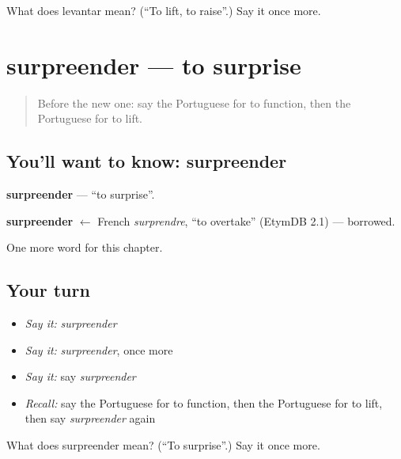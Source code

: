 \begin{tcolorbox}[breakable,colback=teal!4,colframe=teal!35!black,title={Before you move on}]
What does levantar mean? (\textquotedblleft{}To lift, to raise\textquotedblright{}.) Say it once more.
\end{tcolorbox}
\section[surpreender]{surpreender — to surprise}

\label{lesson:PT-C238-surpreender}



\begin{quote}
Before the new one: say the Portuguese for to function, then the Portuguese for to lift.
\end{quote}

\subsection*{You'll want to know: surpreender}
\textbf{surpreender} — \textquotedblleft{}to surprise\textquotedblright{}.

\begin{cousinweb}
\textbf{surpreender} $\leftarrow$ French \emph{surprendre}, \textquotedblleft{}to overtake\textquotedblright{} (EtymDB 2.1) — borrowed.
\end{cousinweb}

\begin{grammarlens}[title={What you've built}]
One more word for this chapter.
\end{grammarlens}

\subsection*{Your turn}
\begin{itemize}
\raggedright
  \item \emph{Say it:} \emph{surpreender}
  \item \emph{Say it:} \emph{surpreender}, once more
  \item \emph{Say it:} say \emph{surpreender}
  \item \emph{Recall:} say the Portuguese for to function, then the Portuguese for to lift, then say \emph{surpreender} again
\end{itemize}

\begin{tcolorbox}[breakable,colback=teal!4,colframe=teal!35!black,title={Before you move on}]
What does surpreender mean? (\textquotedblleft{}To surprise\textquotedblright{}.) Say it once more.
\end{tcolorbox}
